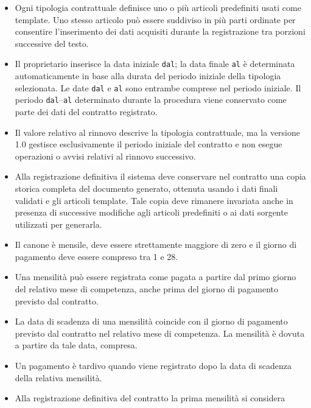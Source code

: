 \documentclass[12pt,a4paper]{article}
\begin{document}
\begin{itemize}
          Per ciascuna tipologia contrattuale sono definiti, in anni, la durata del periodo iniziale
          e la durata del rinnovo: rispettivamente 3 e 2 anni per il canone concordato, 4 e 4 anni
          per il canone libero.
    \item Ogni tipologia contrattuale definisce uno o più articoli predefiniti usati come template.
          Uno stesso articolo può essere suddiviso in più parti ordinate per consentire l'inserimento
          dei dati acquisiti durante la registrazione tra porzioni successive del testo.
    \item Il proprietario inserisce la data iniziale \texttt{dal}; la data finale \texttt{al}
          è determinata automaticamente in base alla durata del periodo iniziale della tipologia
          selezionata. Le date \texttt{dal} e \texttt{al} sono entrambe comprese nel periodo iniziale.
          Il periodo \texttt{dal}--\texttt{al} determinato durante la procedura viene conservato
          come parte dei dati del contratto registrato.
    \item Il valore relativo al rinnovo descrive la tipologia contrattuale, ma la versione 1.0 gestisce
          esclusivamente il periodo iniziale del contratto e non esegue operazioni o avvisi relativi
          al rinnovo successivo.
    \item Alla registrazione definitiva il sistema deve conservare nel contratto una copia storica
          completa del documento generato, ottenuta usando i dati finali validati e gli articoli template.
          Tale copia deve rimanere invariata anche in presenza di successive modifiche agli articoli
          predefiniti o ai dati sorgente utilizzati per generarla.
    \item Il canone è mensile, deve essere strettamente maggiore di zero e il giorno di pagamento deve essere compreso tra 1 e 28.
    \item Una mensilità può essere registrata come pagata a partire dal primo giorno
            del relativo mese di competenza, anche prima del giorno di pagamento
            previsto dal contratto.
      \item La data di scadenza di una mensilità coincide con il giorno di pagamento
            previsto dal contratto nel relativo mese di competenza. La mensilità è
            dovuta a partire da tale data, compresa.
      \item Un pagamento è tardivo quando viene registrato dopo la data di scadenza
            della relativa mensilità.
    \item Alla registrazione definitiva del contratto la prima mensilità si considera

\end{itemize}
\end{document}
